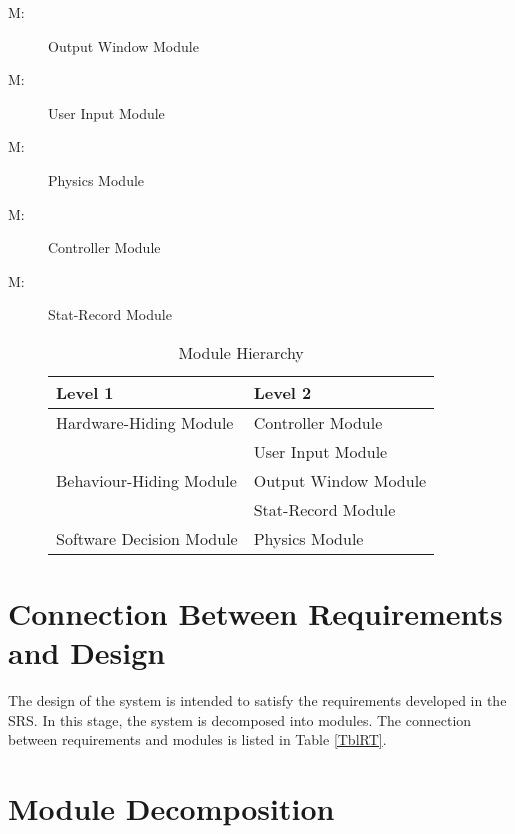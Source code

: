 \documentclass[12pt, titlepage]{article}
\newcounter{mnum}
\newcommand{\mthemnum}{M\themnum}
\begin{document}
\begin{description}
\item [ \mthemnum \label{mHH}:] Output Window Module
\item [ \mthemnum \label{mHH}:] User Input Module
\item [ \mthemnum \label{mHH}:] Physics Module
\item [ \mthemnum \label{mHH}:] Controller Module
\item [ \mthemnum \label{mHH}:] Stat-Record Module

\begin{table}[h!]
\centering
\begin{tabular}{p{} p{}}
\toprule
\textbf{Level 1} & \textbf{Level 2}\\
\midrule
{Hardware-Hiding Module} & Controller Module \\
\midrule
\multirow{3}{0.3\textwidth}{Behaviour-Hiding Module} & User Input Module\\
& Output Window Module\\
& Stat-Record Module\\
\midrule
\multirow{1}{0.3\textwidth}{Software Decision Module} & {Physics Module}\\

\bottomrule
\end{tabular}
\caption{Module Hierarchy}
\label{TblMH}
\end{table}

\end{description}




\section{Connection Between Requirements and Design} \label{SecConnection}

The design of the system is intended to satisfy the requirements developed in
the SRS. In this stage, the system is decomposed into modules. The connection
between requirements and modules is listed in Table \ref{TblRT}.

\section{Module Decomposition} \label{SecMD}
\end{document}

